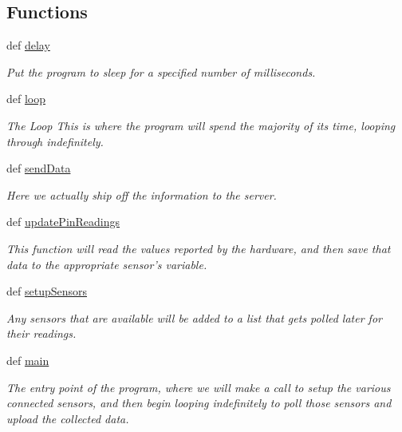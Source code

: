 \subsection*{Functions}
\begin{DoxyCompactItemize}
\item 
def \hyperlink{namespacesensing_a110922c2a80aabf038d162595e137cc4}{delay}
\begin{DoxyCompactList}\small\item\em Put the program to sleep for a specified number of milliseconds. \end{DoxyCompactList}\item 
def \hyperlink{namespacesensing_afc4f85f529614a384ee1d04cd5ff80f3}{loop}
\begin{DoxyCompactList}\small\item\em The Loop This is where the program will spend the majority of its time, looping through indefinitely. \end{DoxyCompactList}\item 
def \hyperlink{namespacesensing_aeae2450fef0f1a9244c1ddc6d96ef4c2}{send\-Data}
\begin{DoxyCompactList}\small\item\em Here we actually ship off the information to the server. \end{DoxyCompactList}\item 
def \hyperlink{namespacesensing_a75479ff0f15da4027d590f94160bb43f}{update\-Pin\-Readings}
\begin{DoxyCompactList}\small\item\em This function will read the values reported by the hardware, and then save that data to the appropriate sensor's variable. \end{DoxyCompactList}\item 
def \hyperlink{namespacesensing_a3b1d400f9ad84146d60ee62f7e82faa0}{setup\-Sensors}
\begin{DoxyCompactList}\small\item\em Any sensors that are available will be added to a list that gets polled later for their readings. \end{DoxyCompactList}\item 
def \hyperlink{namespacesensing_a38d7f8a9b27bbcf471a89725a5e78493}{main}
\begin{DoxyCompactList}\small\item\em The entry point of the program, where we will make a call to setup the various connected sensors, and then begin looping indefinitely to poll those sensors and upload the collected data. \end{DoxyCompactList}\end{DoxyCompactItemize}
